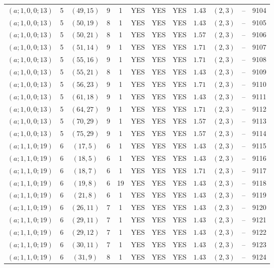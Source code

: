 \begin{longtable}{|c|c|c|c|c|c|c|c|c|c|c|c|}
$(a;1,0,0;13)$ & 5 & $(49,15)$ & 9 & 1 & YES & YES & YES & $1.43$ & $(2,3)$ & -- & 9104\\
$(a;1,0,0;13)$ & 5 & $(50,19)$ & 8 & 1 & YES & YES & YES & $1.43$ & $(2,3)$ & -- & 9105\\
$(a;1,0,0;13)$ & 5 & $(50,21)$ & 8 & 1 & YES & YES & YES & $1.57$ & $(2,3)$ & -- & 9106\\
$(a;1,0,0;13)$ & 5 & $(51,14)$ & 9 & 1 & YES & YES & YES & $1.71$ & $(2,3)$ & -- & 9107\\
$(a;1,0,0;13)$ & 5 & $(55,16)$ & 9 & 1 & YES & YES & YES & $1.71$ & $(2,3)$ & -- & 9108\\
$(a;1,0,0;13)$ & 5 & $(55,21)$ & 8 & 1 & YES & YES & YES & $1.43$ & $(2,3)$ & -- & 9109\\
$(a;1,0,0;13)$ & 5 & $(56,23)$ & 9 & 1 & YES & YES & YES & $1.71$ & $(2,3)$ & -- & 9110\\
$(a;1,0,0;13)$ & 5 & $(61,18)$ & 9 & 1 & YES & YES & YES & $1.43$ & $(2,3)$ & -- & 9111\\
$(a;1,0,0;13)$ & 5 & $(64,27)$ & 9 & 1 & YES & YES & YES & $1.71$ & $(2,3)$ & -- & 9112\\
$(a;1,0,0;13)$ & 5 & $(70,29)$ & 9 & 1 & YES & YES & YES & $1.57$ & $(2,3)$ & -- & 9113\\
$(a;1,0,0;13)$ & 5 & $(75,29)$ & 9 & 1 & YES & YES & YES & $1.57$ & $(2,3)$ & -- & 9114\\
$(a;1,1,0;19)$ & 6 & $(17,5)$ & 6 & 1 & YES & YES & YES & $1.43$ & $(2,3)$ & -- & 9115\\
$(a;1,1,0;19)$ & 6 & $(18,5)$ & 6 & 1 & YES & YES & YES & $1.43$ & $(2,3)$ & -- & 9116\\
$(a;1,1,0;19)$ & 6 & $(18,7)$ & 6 & 1 & YES & YES & YES & $1.71$ & $(2,3)$ & -- & 9117\\
$(a;1,1,0;19)$ & 6 & $(19,8)$ & 6 & 19 & YES & YES & YES & $1.43$ & $(2,3)$ & -- & 9118\\
$(a;1,1,0;19)$ & 6 & $(21,8)$ & 6 & 1 & YES & YES & YES & $1.43$ & $(2,3)$ & -- & 9119\\
$(a;1,1,0;19)$ & 6 & $(26,11)$ & 7 & 1 & YES & YES & YES & $1.43$ & $(2,3)$ & -- & 9120\\
$(a;1,1,0;19)$ & 6 & $(29,11)$ & 7 & 1 & YES & YES & YES & $1.43$ & $(2,3)$ & -- & 9121\\
$(a;1,1,0;19)$ & 6 & $(29,12)$ & 7 & 1 & YES & YES & YES & $1.43$ & $(2,3)$ & -- & 9122\\
$(a;1,1,0;19)$ & 6 & $(30,11)$ & 7 & 1 & YES & YES & YES & $1.43$ & $(2,3)$ & -- & 9123\\
$(a;1,1,0;19)$ & 6 & $(31,9)$ & 8 & 1 & YES & YES & YES & $1.43$ & $(2,3)$ & -- & 9124\\

\end{longtable}
